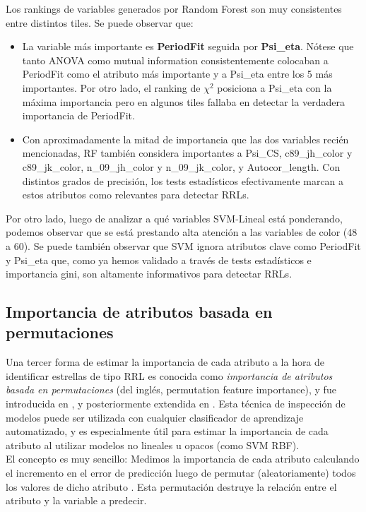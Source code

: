 Los rankings de variables generados por Random Forest son muy consistentes entre distintos tiles. Se puede observar que:

\begin{itemize}
\item La variable más importante es \textbf{PeriodFit} seguida por \textbf{Psi\_eta}. Nótese que tanto ANOVA como mutual information consistentemente colocaban a PeriodFit como el atributo más importante y a Psi\_eta entre los 5 más importantes. Por otro lado, el ranking de $\chi^2$ posiciona a Psi\_eta con la máxima importancia pero en algunos tiles fallaba en detectar la verdadera importancia de PeriodFit.
\item Con aproximadamente la mitad de importancia que las dos variables recién mencionadas, RF también considera importantes a Psi\_CS, c89\_jh\_color y c89\_jk\_color, n\_09\_jh\_color y n\_09\_jk\_color, y Autocor\_length. Con distintos grados de precisión, los tests estadísticos efectivamente marcan a estos atributos como relevantes para detectar RRLs.
\end{itemize}

Por otro lado, luego de analizar a qué variables SVM-Lineal está ponderando, podemos observar que se está prestando alta atención a las variables de color (48 a 60). Se puede también observar que SVM ignora atributos clave como PeriodFit y Psi\_eta que, como ya hemos validado a través de tests estadísticos e importancia gini, son altamente informativos para detectar RRLs. \\

\subsection{Importancia de atributos basada en permutaciones}
Una tercer forma de estimar la importancia de cada atributo a la hora de identificar estrellas de tipo RRL es conocida como \textit{importancia de atributos basada en permutaciones} (del inglés, permutation feature importance), y fue introducida en \cite{rf}, y posteriormente extendida en \cite{fsiher}. Esta técnica de inspección de modelos puede ser utilizada con cualquier clasificador de aprendizaje automatizado, y es especialmente útil para estimar la importancia de cada atributo al utilizar modelos no lineales u opacos (como SVM RBF). \\

El concepto es muy sencillo: Medimos la importancia de cada atributo calculando el incremento en el error de predicción luego de permutar (aleatoriamente) todos los valores de dicho atributo \cite{molnar2019}. Esta permutación destruye la relación entre el atributo y la variable a predecir.  \\

